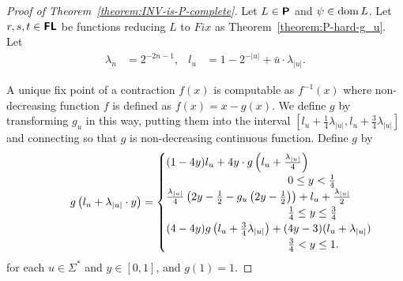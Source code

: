 \documentclass[conference]{IEEEtran}
\newcommand{\classtwofont}[1]{\text{\bfseries \sffamily \upshape #1}}
\newcommand{\classFLtwo}{\classtwofont{FL}}
\newcommand{\classPtwo}{\classtwofont{P}}
\newcommand{\OpCMFix}{\mathit{Fix}}
\newcommand{\dom}{\mathop{\rm dom}}
\theoremstyle{definition}
\theoremstyle{remark}
\begin{document}
\begin{proof}
[Proof of Theorem~\ref{theorem:INV-is-P-complete}]
Let $L \in \classPtwo$ and $\psi \in \dom L$.
Let $r, s, t \in \classFLtwo$ be functions reducing $L$ to $\OpCMFix$
as Theorem~\ref{theorem:P-hard-g_u}.
Let
\begin{align}
 \lambda_n &= 2^{-2n-1},
 &
 l_u & = 1 - 2^{-|u|} + \bar u \cdot \lambda_{|u|}.
\end{align}

A unique fix point of a contraction $f(x)$ is computable as
$f^{-1}(x)$ where non-decreasing function $f$ is defined as $f(x) = x - g(x)$.
We define $g$ by transforming $g_u$ in this way, putting them into the
interval $[l_u + \frac{1}{4}\lambda_{|u|}, l_u + \frac{3}{4}\lambda_{|u|}]$
and connecting so that $g$ is non-decreasing continuous function.
Define $g$ by
\begin{equation}
\label{equation: definition of g}
 g \left( l_u + \lambda_{|u|} \cdot y \right) =
 \begin{cases}
  \rlap{$(1-4y)l_u + 4y \cdot g \left( l_u + \frac{\lambda_{|u|}}{4} \right)$}
  \hspace*{10em}
  \\
  &
  0 \le y < \frac 1 4
  \\
  \rlap{$\frac{\lambda_{|u|}}{4} \left( 2y - \frac 1 2 - g_u \left( 2y - \frac 1 2 \right) \right) + l_u + \frac{\lambda_{|u|}}{2}$}
  \\
  &
  \frac 1 4 \le y \le \frac 3 4
  \\
  \rlap{$(4-4y) g \left( l_u + \frac 3 4 \lambda_{|u|} \right) + (4y-3)(l_u + \lambda_{|u|})$}
  \\
  &
  \frac 3 4 < y \le 1.
 \end{cases}\notag
\end{equation}
for each $u \in \varSigma^*$ and $y \in [0,1]$, and $g(1) = 1$.


\end{proof}
\end{document}
